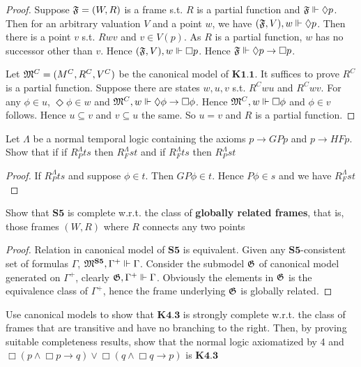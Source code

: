 \documentclass[11pt]{article}
\begin{document}
\begin{proof}
Suppose \(\mathfrak{F}=(W,R)\) is a frame s.t. \(R\) is a partial function and
\(\mathfrak{F}\Vdash\Diamond p\). Then for an arbitrary valuation \(V\) and a point
\(w\), we have \((\mathfrak{F},V),w\Vdash\Diamond p\). Then there is a point \(v\)
s.t. \(Rwv\) and \(v\in V(p)\). As \(R\) is a partial function, \(w\) has no
successor other than \(v\). Hence \((\mathfrak{F},V),w\Vdash\Box p\). Hence
\(\mathfrak{F}\Vdash\Diamond p\to\Box p\).

Let \(\mathfrak{M}^C=(M^C,R^C,V^C)\) be the canonical model of \(\textbf{K1.1}\).
It suffices to prove \(R^C\) is a partial function. Suppose there are states
\(w,u,v\) s.t. \(R^Cwu\) and \(R^Cwv\). For any \(\phi\in u\),
\(\Diamond \phi\in w\) and \(\mathfrak{M}^C,w\Vdash\Diamond\phi\to\Box\phi\). Hence
\(\mathfrak{M}^C,w\Vdash\Box\phi\) and \(\phi\in v\) follows. Hence \(u\subseteq v\)
and \(v\subseteq u\) the same. So \(u=v\) and \(R\) is a partial function.
\end{proof}

\begin{exercise}
\label{ex4.3.2}
Let \(\Lambda\) be a normal temporal logic containing the axioms \(p\to GPp\) and
\(p\to HFp\). Show that if if \(R_P^\Lambda ts\) then \(R_F^\Lambda st\) and if
\(R_F^\Lambda ts\) then \(R_P^\Lambda st\)
\end{exercise}

\begin{proof}
   If \(R_P^\Lambda ts\) and suppose \(\phi\in t\). Then \(GP\phi \in t\). Hence
\(P\phi\in s\) and we have \(R_F^\Lambda st\)
\end{proof}

\begin{exercise}
\label{ex4.3.6}
Show that \(\textbf{S5}\) is complete w.r.t. the class of \textbf{globally related
frames}, that is, those frames \((W,R)\) where \(R\) connects any two points
\end{exercise}

\begin{proof}
Relation in canonical model of \(\textbf{S5}\) is equivalent. Given any
\(\textbf{S5}\)-consistent set of formulas \(\Gamma\),
\(\mathfrak{M}^{\textbf{S5}},\Gamma^+\Vdash\Gamma\). Consider the submodel \(\mathfrak{G}\) of canonical
model generated on \(\Gamma^+\), clearly \(\mathfrak{G},\Gamma^+\Vdash\Gamma\). Obviously the
elements in \(\mathfrak{G}\) is the equivalence class of \(\Gamma^+\), hence the frame
underlying \(\mathfrak{G}\) is globally related.
\end{proof}

\begin{exercise}
\label{4.3.3}
Use canonical models to show that \(\textbf{K4.3}\) is strongly complete
w.r.t. the class of frames that are transitive and have no branching to the
right. Then, by proving suitable completeness results, show that the normal
logic axiomatized by 4 and \(\Box(p\wedge\Box p\to q)\vee\Box(q\wedge\Box
   q\to p)\) is \(\textbf{K4.3}\)
\end{exercise}
\end{document}
